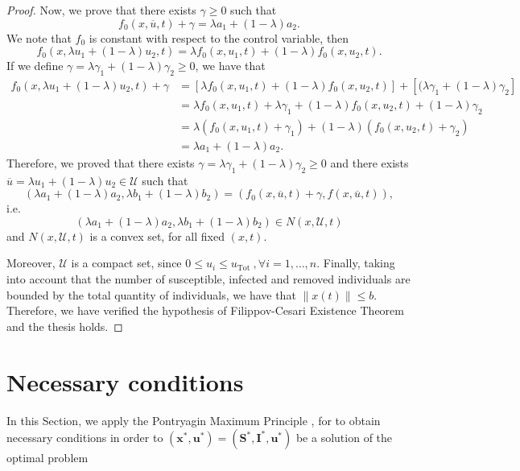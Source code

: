 \documentclass[a4paper,10pt]{article}
\theoremstyle{remark}
\newcommand{\bm}[1]{\boldsymbol{#1}}
\begin{document}
\begin{proof}
Now, we prove that there exists $\gamma \geq 0$ such that
$$f_{0}\left(x, \overline{ u}, t\right)+\gamma=\lambda a_{1}+(1-\lambda) a_{2}.$$
We note that $f_0$ is constant with respect to the control variable, then
$$
f_{0}\left(x, \lambda  u_{1}+(1-\lambda)  u_{2}, t\right)=\lambda f_{0}\left(x,  u_{1}, t\right)+(1-\lambda) f_{0}\left(x,  u_{2}, t\right).
$$
If we define $\gamma=\lambda \gamma_{1}+(1-\lambda) \gamma_{2} \geq 0$, we have that
$$
\begin{aligned}
f_{0}\left(x,\lambda  u_{1}+(1-\lambda)  u_{2}, t\right)+\gamma &=\left[\lambda f_{0}\left(x, u_{1}, t\right)+(1-\lambda) f_{0}\left(x,  u_{2}, t\right)\right]+\left[(\lambda \gamma_{1}+(1-\lambda) \gamma_{2}\right] \\
&=\lambda f_{0}\left(x, u_{1}, t\right)+\lambda \gamma_{1}+(1-\lambda) f_{0}\left(x,  u_{2}, t\right)+(1-\lambda) \gamma_{2} \\
&=\lambda\left(f_{0}\left(x,  u_{1}, t\right)+\gamma_{1}\right)+(1-\lambda)\left(f_{0}\left(x,  u_{2}, t\right)+\gamma_{2}\right) \\
&=\lambda a_{1}+(1-\lambda) a_{2}.
\end{aligned}
$$
Therefore, we proved that there exists 
$\gamma=\lambda \gamma_{1}+(1-\lambda) \gamma_{2} \geq 0$ and there exists $\overline{ u}=\lambda  u_{1}+(1-\lambda)  u_{2} \in \mathscr{U}$
such that 
$$\left(\lambda {a_{1}}+(1-\lambda) {a_{2}}, \lambda b_{1}+(1-\lambda) b_{2}\right)=\left(f_{0}\left(x, \overline{ u}, t\right)+\gamma , f\left(x, \overline{ u}, t\right)\right),$$
i.e.
$$\left(\lambda a_{1}+(1-\lambda) a_{2}, \lambda b_{1}+(1-\lambda) b_{2}\right) \in N\left(x, \mathscr{U}, t\right)$$
and $N\left(x, \mathscr{U}, t\right)$ is a convex set, for all fixed $(x,t)$.

Moreover, $\mathscr{U}$ is a compact set, since $0 \leq  u_{i} \leq  u_{\text {Tot }}, \forall i=1, \ldots, n$. Finally, taking into account that the number of susceptible, infected and removed individuals are bounded by the total quantity of individuals, we have that $\|x(t)\| \leqslant b$. Therefore, we have verified the hypothesis of Filippov-Cesari Existence Theorem and the thesis holds.
\end{proof}

\section{Necessary conditions}

In this Section, we apply the Pontryagin Maximum Principle \cite[Th. 4.1]{A.Seierstad499}, \cite{hartl1995survey} for to  obtain necessary conditions  in order to $(\bm{x}^*,\bm{u}^*)=(\bm{S}^*,\bm{I}^*,\bm{u}^*)$ be a solution of the optimal problem 
\end{document}
